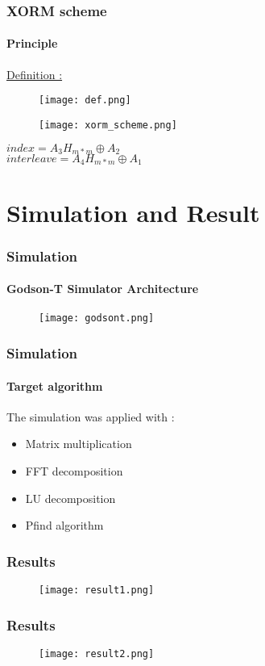 \documentclass{beamer}
\begin{document}
\begin{frame}
\frametitle{XORM scheme}
\framesubtitle{Principle}
\underline{Definition :}
\begin{figure}
\texttt{[image: def.png]}
\end{figure}
\pause
\begin{figure}
\texttt{[image: xorm\_scheme.png]}
\end{figure}
\pause
\begin{exampleblock}{}
\begin{center}
$ index = A_3 H_{m*m} \oplus A_2$\\
$ interleave = A_4 H_{m*m} \oplus A_1$
\end{center}
\end{exampleblock}{}
\end{frame}


\section{Simulation and Result}
\begin{frame}
\frametitle{Simulation}
\framesubtitle{Godson-T Simulator Architecture}
\begin{figure}
\texttt{[image: godsont.png]}
\end{figure}
\end{frame}

\begin{frame}
\frametitle{Simulation}
\framesubtitle{Target algorithm}
The simulation was applied with :
\begin{exampleblock}{}
\begin{itemize}
\item Matrix multiplication
\item FFT decomposition
\item LU decomposition
\item Pfind algorithm
\end{itemize}
\end{exampleblock}{}
\end{frame}

\begin{frame}
\frametitle{Results}
\begin{figure}
\texttt{[image: result1.png]}
\end{figure}
\end{frame}

\begin{frame}
\frametitle{Results}
\begin{figure}
\texttt{[image: result2.png]}
\end{figure}
\end{frame}
\end{document}

